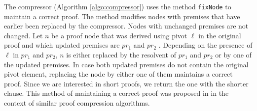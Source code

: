 

The compressor (Algorithm \ref{algo:compressor}) uses the method \texttt{fixNode} to maintain a correct proof.
The method modifies nodes with premises that have earlier been replaced by the compressor. 
Nodes with unchanged premises are not changed.
Let $n$ be a proof node that was derived using pivot $\ell$ in the original proof and which updated premises are $pr_1$ and $pr_2$ .
Depending on the presence of $\ell$ in $pr_1$ and $pr_2$, $n$ is either replaced by the resolvent of $pr_1$ and $pr_2$ or by one of the updated premises.
In case both updated premises do not contain the original pivot element, replacing the node by either one of them maintains a correct proof.
Since we are interested in short proofs, we return the one with the shorter clause.
This method of maintaining a correct proof was proposed in \cite{Bar-Ilan2008} in the context of similar proof compression algorithms.



\FloatBarrier
